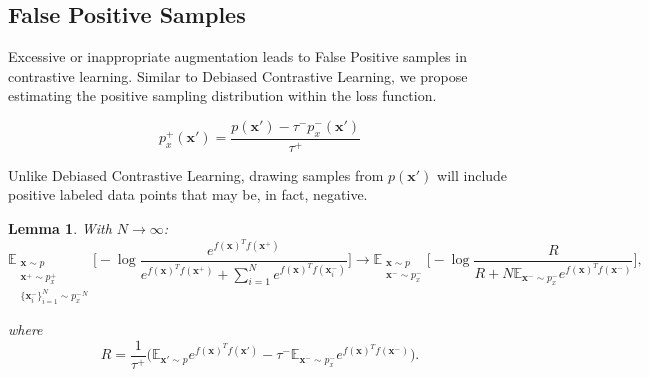 \documentclass{article}
\begin{document}
\subsection{False Positive Samples} \label{FP}
Excessive or inappropriate augmentation leads to False Positive samples in contrastive learning. Similar to Debiased Contrastive Learning, we propose estimating the positive sampling distribution within the loss function.

\begin{equation}  \label{eq:8}
p_x^+ (\textbf{x}') = \frac{p(\textbf{x}') - \tau^- p^-_x(\textbf{x}')}{\tau^+}
\end{equation}

Unlike Debiased Contrastive Learning, drawing samples from $p(\textbf{x}')$ will include positive labeled data points that may be, in fact, negative.

\newtheorem{theorem}{Theorem}
\newtheorem{lemma}[theorem]{Lemma}

\begin{lemma}
With $N \to \infty$:
\begin{equation} \label{eq:9}
\mathbb{E}_{\substack{\textbf{x} \sim p \\ \textbf{x}^+ \sim p_x^+ \\ \{\textbf{x}_i^-\}_{i=1}^N \sim {p_x^-}^N}} \bigg[ - \log \frac{e^{f(\textbf{x})^T f(\textbf{x}^+)}}{e^{f(\textbf{x})^T f(\textbf{x}^+)} + \sum_{i=1}^N e^{f(\textbf{x})^T f(\textbf{x}_i^-)}} \bigg] \longrightarrow
\mathbb{E}_{\substack{\textbf{x} \sim p \\ \textbf{x}^- \sim p_x^-}} \bigg[ - \log \frac{R}{R + N \mathbb{E}_{\textbf{x}^- \sim p_x^-} e^{f(\textbf{x})^T f(\textbf{x}^-)}} \bigg],
\end{equation}

where
\begin{equation}  \label{eq:10}
R = \frac{1}{\tau^+} \big(\mathbb{E}_{\textbf{x}' \sim p} e^{f(\textbf{x})^T f(\textbf{x}')} - \tau^- \mathbb{E}_{\textbf{x}^- \sim p_x^-} e^{f(\textbf{x})^T f(\textbf{x}^-)}\big).
\end{equation}
\end{lemma}
\end{document}
